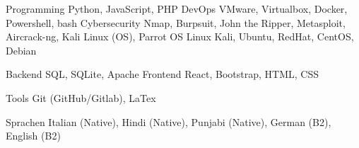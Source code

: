 

\begin{cvskills}

  \cvskill
    {Programming} %
    {Python, JavaScript, PHP} %
  \cvskill
    {DevOps} %
    {VMware, Virtualbox, Docker, Powershell, bash} %
  \cvskill
    {Cybersecurity} %
    {Nmap, Burpsuit, John the Ripper, Metasploit, Aircrack-ng, Kali Linux (OS), Parrot OS } %
	  \cvskill
    {Linux} %
    {Kali, Ubuntu, RedHat, CentOS, Debian} %

  \cvskill
    {Backend} %
    {SQL, SQLite, Apache} %
      \cvskill
    {Frontend} %
    {React, Bootstrap, HTML, CSS} %

  \cvskill
    {Tools} %
    {Git (GitHub/Gitlab), LaTex} %

  \cvskill
    {Sprachen} %
    {Italian (Native), Hindi (Native), Punjabi (Native), German (B2), English (B2)} %


\end{cvskills}
